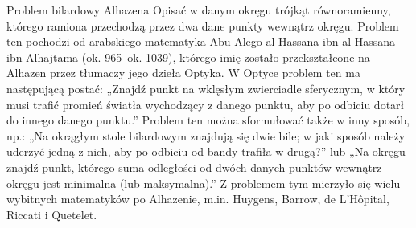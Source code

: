 \documentclass{greaseproof}
\begin{document}
Problem bilardowy Alhazena
Opisać w danym okręgu trójkąt równoramienny, którego ramiona przechodzą przez dwa dane punkty wewnątrz okręgu.
Problem ten pochodzi od arabskiego matematyka Abu Alego al Hassana ibn al Hassana ibn Alhajtama (ok. 965–ok. 1039), którego imię zostało przekształcone na Alhazen przez tłumaczy jego dzieła Optyka.
W Optyce problem ten ma następującą postać:
„Znajdź punkt na wklęsłym zwierciadle sferycznym, w który musi trafić promień światła wychodzący z danego punktu, aby po odbiciu dotarł do innego danego punktu.”
Problem ten można sformułować także w inny sposób, np.:
„Na okrągłym stole bilardowym znajdują się dwie bile; w jaki sposób należy uderzyć jedną z nich, aby po odbiciu od bandy trafiła w drugą?”
lub
„Na okręgu znajdź punkt, którego suma odległości od dwóch danych punktów wewnątrz okręgu jest minimalna (lub maksymalna).”
Z problemem tym mierzyło się wielu wybitnych matematyków po Alhazenie, m.in. Huygens, Barrow, de L’Hôpital, Riccati i Quetelet.



{}


\raggedright
{}
\printindex

\printindex[persons]
\end{document}
